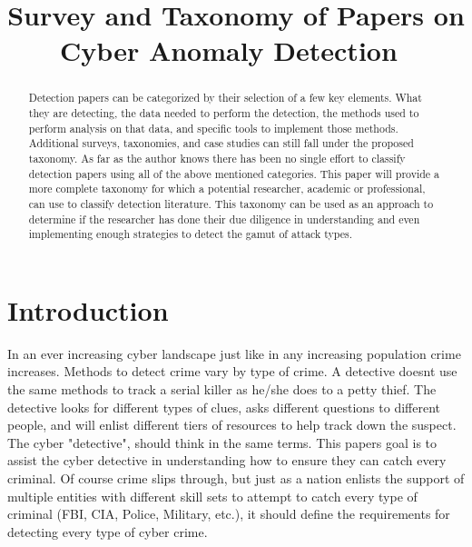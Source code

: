 \documentclass[conference]{IEEEtran}
\begin{document}
\title{Survey and Taxonomy of Papers on Cyber Anomaly Detection\
}

\author{
}

\maketitle

\begin{abstract}
Detection papers can be categorized by their selection of a few key elements. What they are detecting, the data needed to perform the detection, the methods used to perform analysis on that data, and specific tools to implement those methods. Additional surveys, taxonomies, and case studies can still fall under the proposed taxonomy. As far as the author knows there has been no single effort to classify detection papers using all of the above mentioned categories. This paper will provide a more complete taxonomy for which a potential researcher, academic or professional, can use to classify detection literature. This taxonomy can be used as an approach to determine if the researcher has done their due diligence in understanding and even implementing enough strategies to detect the gamut of attack types. 
\end{abstract}

\section{Introduction}
In an ever increasing cyber landscape just like in any increasing population crime increases. Methods to detect crime vary by type of crime. A detective doesnt use the same methods to track a serial killer as he/she does to a petty thief. The detective looks for different types of clues, asks different questions to different people, and will enlist different tiers of resources to help track down the suspect. The cyber "detective", should think in the same terms. This papers goal is to assist the cyber detective in understanding how to ensure they can catch every criminal. Of course crime slips through, but just as a nation enlists the support of multiple entities with different skill sets to attempt to catch every type of criminal (FBI, CIA, Police, Military, etc.), it should define the requirements for detecting every type of cyber crime. 
\end{document}
